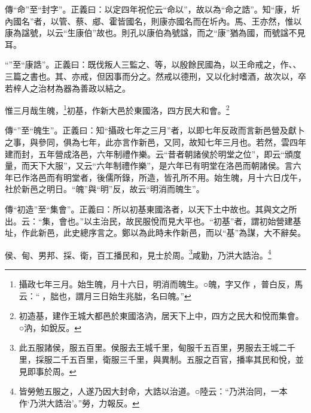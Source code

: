 {\noindent\zhuan{}\fzbyks 傳“命”至“封字”。正義曰：以定四年祝佗云“命以”，故以為“命之誥”。知“康，圻內國名”者，以管、蔡、郕、霍皆國名，則康亦國名而在圻內。馬、王亦然，惟以康為諡號，以云“生康伯”故也。則孔以康伯為號諡，而之“康”猶為國，而號諡不見耳。 \par}

{\noindent\shu{}\fzkt “”至“康誥”。正義曰：既伐叛人三監之、等，以殷餘民國為，以王命戒之，作、、三篇之書也。其、亦戒，但因事而分之。然戒以德刑，又以化紂嗜酒，故次以，卒若梓人之治材為器為善政以結之。 \par}

惟三月哉生魄，\footnote{攝政七年三月。始生魄，月十六日，明消而魄生。○魄，字又作𩲸，普白反，馬云：“𩲸，朏也，謂月三日始生兆朏，名曰魄。”}初基，作新大邑於東國洛，四方民大和會。\footnote{初造基，建作王城大都邑於東國洛汭，居天下上中，四方之民大和悅而集會。○汭，如銳反。}


{\noindent\zhuan{}\fzbyks 傳“”至“魄生”。正義曰：知“攝政七年之三月”者，以即七年反政而言新邑營及獻卜之事，與參同，俱為七年，此亦言作新邑，又同，故知七年三月也。若然，雲四年建而封，五年營成洛邑，六年制禮作樂。云“昔者朝諸侯於明堂之位”，即云“頒度量，而天下大服”，又云“六年制禮作樂”，是六年已有明堂在洛邑而朝諸侯。言六年已作洛邑而有明堂者，後儒所錄，所造，皆孔所不用。始生魄，月十六日戊午，社於新邑之明日。“魄”與“明”反，故云“明消而魄生”。 \par}

{\noindent\zhuan{}\fzbyks 傳“初造”至“集會”。正義曰：所以初基東國洛者，以天下土中故也。其與文之所出。云：“集，會也。”以主治民，故民服悅而見大平也。“初基”者，謂初始營建基址，作此新邑，此史總序言之。鄭以為此時未作新邑，而以“基”為謀，大不辭矣。 \par}

侯、甸、男邦、採、衛，百工播民和，見士於周。\footnote{此五服諸侯，服五百里。侯服去王城千里，甸服千五百里，男服去王城二千里，採服二千五百里，衛服三千里，與異制。五服之百官，播率其民和悅，並見即事於周。}咸勤，乃洪大誥治。\footnote{皆勞勉五服之，人遂乃因大封命，大誥以治道。○陸云：“乃洪治同，一本作‘乃洪大誥治’。”勞，力報反。}

